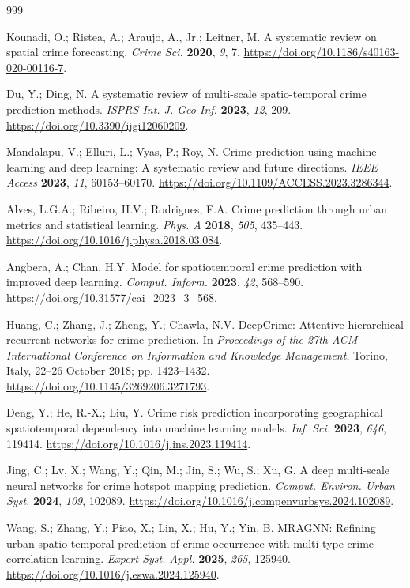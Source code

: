 \begin{thebibliography}{999}

Kounadi, O.; Ristea, A.; Araujo, A., Jr.; Leitner, M. A systematic review on spatial crime forecasting. \emph{Crime Sci.} \textbf{2020}, \emph{9}, 7. \url{https://doi.org/10.1186/s40163-020-00116-7}.

Du, Y.; Ding, N. A systematic review of multi-scale spatio-temporal crime prediction methods. \emph{ISPRS Int. J. Geo-Inf.} \textbf{2023}, \emph{12}, 209. \url{https://doi.org/10.3390/ijgi12060209}.

Mandalapu, V.; Elluri, L.; Vyas, P.; Roy, N. Crime prediction using machine learning and deep learning: A systematic review and future directions. \emph{IEEE Access} \textbf{2023}, \emph{11}, 60153--60170. \url{https://doi.org/10.1109/ACCESS.2023.3286344}.

Alves, L.G.A.; Ribeiro, H.V.; Rodrigues, F.A. Crime prediction through urban metrics and statistical learning. \emph{Phys. A} \textbf{2018}, \emph{505}, 435--443. \url{https://doi.org/10.1016/j.physa.2018.03.084}.

Angbera, A.; Chan, H.Y. Model for spatiotemporal crime prediction with improved deep learning. \emph{Comput. Inform.} \textbf{2023}, \emph{42}, 568--590. \url{https://doi.org/10.31577/cai_2023_3_568}.

Huang, C.; Zhang, J.; Zheng, Y.; Chawla, N.V. DeepCrime: Attentive hierarchical recurrent networks for crime prediction. In \emph{Proceedings of the 27th ACM International Conference on Information and Knowledge Management}, Torino, Italy, 22--26 October 2018; pp. 1423--1432. \url{https://doi.org/10.1145/3269206.3271793}.

Deng, Y.; He, R.-X.; Liu, Y. Crime risk prediction incorporating geographical spatiotemporal dependency into machine learning models. \emph{Inf. Sci.} \textbf{2023}, \emph{646}, 119414. \url{https://doi.org/10.1016/j.ins.2023.119414}.

Jing, C.; Lv, X.; Wang, Y.; Qin, M.; Jin, S.; Wu, S.; Xu, G. A deep multi-scale neural networks for crime hotspot mapping prediction. \emph{Comput. Environ. Urban Syst.} \textbf{2024}, \emph{109}, 102089. \url{https://doi.org/10.1016/j.compenvurbsys.2024.102089}.

Wang, S.; Zhang, Y.; Piao, X.; Lin, X.; Hu, Y.; Yin, B. MRAGNN: Refining urban spatio-temporal prediction of crime occurrence with multi-type crime correlation learning. \emph{Expert Syst. Appl.} \textbf{2025}, \emph{265}, 125940. \url{https://doi.org/10.1016/j.eswa.2024.125940}.


\end{thebibliography}

